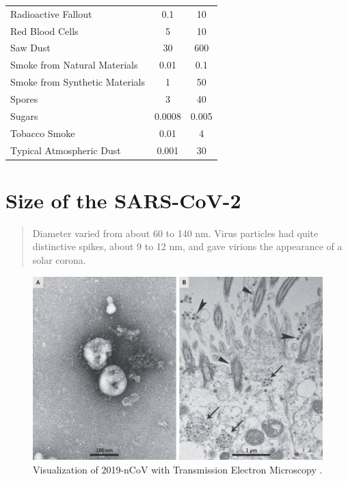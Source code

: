 \documentclass[10pt]{article} %
\begin{document}
\begin{table}[h!]
\begin{center}
\begin{tabular}{lSS}
	Radioactive Fallout 	                 & 0.1 & 10\\ 
	Red Blood Cells 	                 & 5 & 10\\
	Saw Dust 	                       & 30 & 600\\
	Smoke from Natural Materials    & 0.01 & 0.1\\
	Smoke from Synthetic Materials  & 1 & 50\\
	Spores                                  & 3 & 40\\
	Sugars                                  & 0.0008 & 0.005\\
	Tobacco Smoke                      & 0.01 & 4\\
	Typical Atmospheric Dust          & 0.001 & 30\\
      \bottomrule %
    \end{tabular}
  \end{center}
\end{table}

\section{Size of the SARS-CoV-2}

\begin{quote}
Diameter varied from about 60 to 140 nm. Virus particles had quite distinctive spikes, about 9 to 12 nm, and gave virions the appearance of a solar corona. \cite{Zhu2020}
\end{quote}

\begin{figure}[!h]
  \includegraphics[width=\linewidth]{nCoV.jpg}
  \caption{Visualization of 2019-nCoV with Transmission Electron Microscopy  \cite{Zhu2020}.}
  \label{fig:2019-nCoV}
\end{figure}
\end{document}
